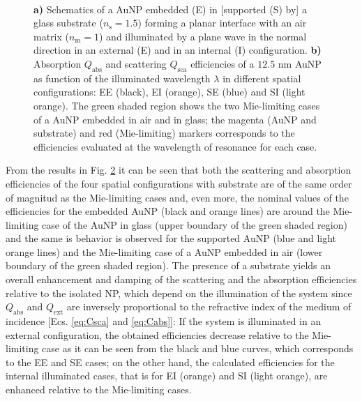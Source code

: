 \begin{figure}[b!]
    \hspace*{-19.15em}%
    \vspace*{-1.25em}%
        \begin{subfigure}{.385\textwidth}\caption{ }\label{sfig:TotallyNormal:1}\end{subfigure}%
        \begin{subfigure}{.25\textwidth}\caption{ }\label{sfig:TotallyNormal:2}\end{subfigure} \\
    \def\svgwidth{.95\textwidth}
    \small
    \centering
    \vspace*{0em}
    \caption[Absorption and Scattering Efficiencies of a 12.5 nm AuNP above and below a planar Interface Illuminated at Normal Incidence]{\textbf{a)} Schematics of a AuNP embedded (E) in [supported (S) by] a glass substrate ($n_\text{s} = 1.5$) forming a planar interface with an air matrix ($n_\text{m} = 1$) and illuminated by a plane wave in the normal direction in an external (E) and in an internal (I) configuration. \textbf{b)} Absorption $Q_\text{abs}$ and scattering $Q_\text{sca}$ efficiencies of a $12.5$ nm AuNP as function of the illuminated wavelength $\lambda$ in different spatial configurations: EE (black), EI (orange), SE (blue) and SI (light orange). The green shaded region shows the two Mie-limiting cases of a  AuNP embedded in air and in glass; the magenta (AuNP and substrate) and red (Mie-limiting) markers corresponds to the efficiencies evaluated at the wavelength of resonance for each case.
    }
\label{fig:TotallyNormal}
\end{figure}

From the results in Fig. \ref{sfig:TotallyNormal:2} it can be seen that both the scattering and absorption efficiencies of the four spatial configurations with substrate are of the same order of magnitud as the Mie-limiting cases and, even more, the nominal values of the efficiencies for the embedded AuNP (black and orange lines) are around the Mie-limiting case of the AuNP in glass (upper boundary of the green shaded region) and the same is behavior is observed for the supported AuNP (blue and light orange lines) and the Mie-limiting case of a AuNP embedded in air (lower boundary of the green shaded region). The presence of a substrate yields an overall enhancement and damping of the scattering and the absorption efficiencies relative to the isolated NP, which depend on the illumination of the system since $Q_\text{abs}$ and $Q_\text{ext}$ are inversely proportional to the refractive index of the medium of incidence [Ecs. \eqref{eq:Csca} and \eqref{eq:Cabs}]: If the system is illuminated in an external configuration, the obtained efficiencies decrease relative to the Mie-limiting case as it can be seen from the black  and blue curves, which corresponds to the EE and SE cases; on the other hand, the calculated efficiencies for the internal illuminated cases, that is for EI (orange) and SI (light orange), are enhanced relative to the Mie-limiting cases.

